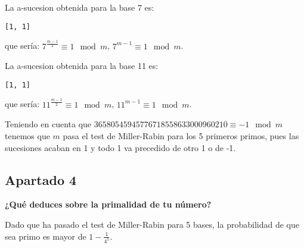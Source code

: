 \documentclass[a4paper]{article}
\begin{document}
La a-sucesion obtenida para la base 7 es:
\begin{verbatim}
[1, 1]
\end{verbatim}
que sería: $7^{\frac{m-1}{2}}\equiv 1\mod m$, $7^{m-1}\equiv 1\mod m$.

La a-sucesion obtenida para la base 11 es:
\begin{verbatim}
[1, 1]
\end{verbatim}
que sería: $11^{\frac{m-1}{2}}\equiv 1\mod m$, $11^{m-1}\equiv 1\mod m$.

Teniendo en cuenta que $36580545945776718558633000960210\equiv -1\mod m$ tenemos que $m$ pasa el test de Miller-Rabin para los 5 primeros primos, pues las sucesiones acaban en 1 y todo 1 va precedido de otro 1 o de -1.


\subsection{Apartado 4}
\textbf{¿Qué deduces sobre la primalidad de tu número?}

Dado que ha pasado el test de Miller-Rabin para 5 bases, la probabilidad de que sea primo es mayor de $1-\frac{1}{4^5}$.
\end{document}
